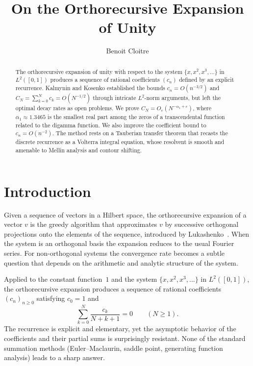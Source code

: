 \documentclass[11pt]{amsart}
\title{On the Orthorecursive Expansion of Unity}
\author{Benoit Cloitre}
\theoremstyle{definition}
\theoremstyle{remark}
\newcommand{\eps}{\varepsilon}
\begin{document}
\begin{abstract}
The orthorecursive expansion of unity with respect to the system $\{x, x^2, x^3, \ldots\}$ in $L^2([0,1])$ produces a sequence of rational coefficients $(c_n)$ defined by an explicit recurrence. Kalmynin and Kosenko established the bounds $c_n = O(n^{-3/2})$ and $C_N = \sum_{k=0}^{N} c_k = O(N^{-1/2})$ through intricate $L^2$-norm arguments, but left the optimal decay rates as open problems. We prove $C_N = O_\eps(N^{-\alpha_1+\eps})$, where $\alpha_1 \approx 1.3465$ is the smallest real part among the zeros of a transcendental function related to the digamma function. We also improve the coefficient bound to $c_n = O(n^{-2})$. The method rests on a Tauberian transfer theorem that recasts the discrete recurrence as a Volterra integral equation, whose resolvent is smooth and amenable to Mellin analysis and contour shifting.
\end{abstract}



\maketitle


\section{Introduction}

Given a sequence of vectors in a Hilbert space, the orthorecursive expansion of a vector $v$ is the greedy algorithm that approximates $v$ by successive orthogonal projections onto the elements of the sequence, introduced by Lukashenko~\cite{Lukashenko}. When the system is an orthogonal basis the expansion reduces to the usual Fourier series. For non-orthogonal systems the convergence rate becomes a subtle question that depends on the arithmetic and analytic structure of the system.

Applied to the constant function~$1$ and the system $\{x, x^2, x^3, \ldots\}$ in $L^2([0,1])$, the orthorecursive expansion produces a sequence of rational coefficients $(c_n)_{n \geq 0}$ satisfying $c_0 = 1$ and
\begin{equation}\label{eq:recurrence}
\sum_{k=0}^{N} \frac{c_k}{N+k+1} = 0 \qquad (N \geq 1).
\end{equation}
The recurrence is explicit and elementary, yet the asymptotic behavior of the coefficients and their partial sums is surprisingly resistant. None of the standard summation methods (Euler--Maclaurin, saddle point, generating function analysis) leads to a sharp answer.
\end{document}
